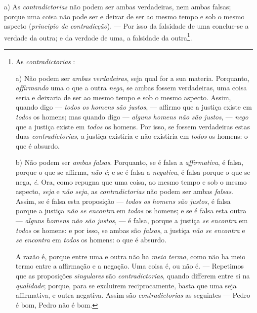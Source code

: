 
 

a) As \emph{contradictorias} não podem ser ambas verdadeiras, nem ambas falsas; porque uma coisa não pode ser e deixar de ser ao mesmo tempo e sob o mesmo aspecto (\emph{principio de contradicção}). --- Por isso da falsidade de uma conclue-se a verdade da outra; e da verdade de uma, a falsidade da outra\footnote{As \emph{contradictorias} :\par a) Não podem ser \emph{ambas verdadeiras}, seja qual for a sua materia. Porquanto, \emph{affirmando} uma o que a outra \emph{nega}, se ambas fossem verdadeiras, uma coisa seria e deixaria de ser ao mesmo tempo e sob o mesmo aspecto. Assim, quando digo --- \emph{todos os homens são justos}, --- affirmo que a justiça existe em \emph{todos} os homens; mas quando digo --- \emph{alguns homens não são justos}, --- \emph{nego} que a justiça existe em \emph{todos} os homens. Por isso, se fossem verdadeiras estas duas \emph{contradictorias}, a justiça existiria e não existiria em \emph{todos} os homens: o que é absurdo.\par b) Não podem ser \emph{ambas falsas}. Porquanto, se é falsa a \emph{affirmativa}, é falsa, porque o que se affirma, \emph{não é}; e se é falsa a \emph{negativa}, é falsa porque o que se nega, \emph{é}. Ora, como repugna que uma coisa, ao mesmo tempo e sob o mesmo aspecto, \emph{seja} e \emph{não seja}, as \emph{contradictorias} não podem ser ambas \emph{falsas}. Assim, se é falsa esta proposição --- \emph{todos os homens são justos}, é falsa porque a justiça \emph{não se encontra} em \emph{todos} os homens; e se é falsa esta outra --- \emph{alguns homens não são justos}, --- é falsa, porque a justiça \emph{se encontra} em \emph{todos} os homens: e por isso, se ambas são \emph{falsas}, a justiça \emph{não se encontra} e \emph{se encontra} em \emph{todos} os homens: o que é absurdo.\par A razão é, porque entre uma e outra não ha \emph{meio termo}, como não ha meio termo entre a affirmação e a negação. Uma coisa é, ou não é. --- Repetimos que as proposições \emph{singulares} são \emph{contradictorias}, quando differem entre si na \emph{qualidade}; porque, para se excluirem reciprocamente, basta que uma seja affirmativa, e outra negativa. Assim são \emph{contradictorias} as seguintes --- Pedro é bom, Pedro não é bom.}.

